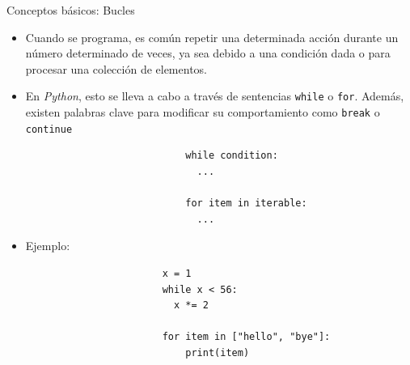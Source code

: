 \documentclass{beamer}
\begin{document}
    \begin{frame}[fragile]{Conceptos básicos: Bucles}
        \begin{itemize}
          \item Cuando se programa, es común repetir una determinada acción durante un número determinado de veces, ya sea debido a una condición dada o para procesar una colección de elementos.
          \item En \emph{Python}, esto se lleva a cabo a través de sentencias \texttt{while} o \texttt{for}. Además, existen palabras clave para modificar su comportamiento como \texttt{break} o \texttt{continue}

          \begin{figure}
              \begin{minipage}[c]{0.5\textwidth}
                  \begin{verbatim}
                      while condition:
                        ...

                      for item in iterable:
                        ...
                  \end{verbatim}
              \end{minipage}
          \end{figure}
          \item Ejemplo:
          \begin{figure}
              \begin{minipage}[c]{0.5\textwidth}
                  \begin{verbatim}
                  x = 1
                  while x < 56:
                    x *= 2

                  for item in ["hello", "bye"]:
                      print(item)
                  \end{verbatim}
              \end{minipage}
          \end{figure}
        \end{itemize}
    \end{frame}
\end{document}
